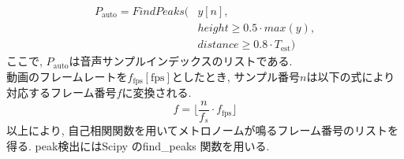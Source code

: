 \documentclass[paper]{ieicej}
\begin{document}
\begin{equation}
  \begin{split}
  P_{\mathrm{auto}}=FindPeaks(&y[n],\\
                     &height \geq 0.5 \cdot max(y),\\
                     &distance \geq 0.8 \cdot T_{\mathrm{est}})
  \end{split}
\end{equation} 
ここで, $P_{\mathrm{auto}}$は音声サンプルインデックスのリストである. \\
動画のフレームレートを$f_{\mathrm{fps}} [\mathrm{fps}]$としたとき, サンプル番号$n$は以下の式により対応するフレーム番号$f$に変換される. 
\begin{equation}
  f=\lfloor\frac{n}{f_{s}} \cdot f_{\mathrm{fps}} \rfloor
\end{equation}
以上により, 自己相関関数を用いてメトロノームが鳴るフレーム番号のリストを得る. peak検出にはScipy \cite{ref27}のfind\_peaks 関数を用いる.
\end{document}
